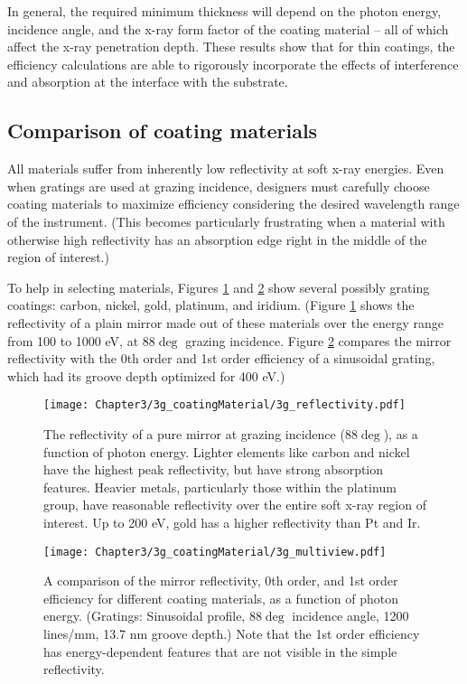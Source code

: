 In general, the required minimum thickness will depend on the photon energy, incidence angle, and the x-ray form factor of the coating material -- all of which affect the x-ray penetration depth.  These results show that for thin coatings, the efficiency calculations are able to rigorously incorporate the effects of interference and absorption at the interface with the substrate.

\subsection{Comparison of coating materials}
All materials suffer from inherently low reflectivity at soft x-ray energies.  Even when gratings are used at grazing incidence, designers must carefully choose coating materials to maximize efficiency considering the desired wavelength range of the instrument.  (This becomes particularly frustrating when a material with otherwise high reflectivity has an absorption edge right in the middle of the region of interest.)

To help in selecting materials, Figures \ref{3g} and \ref{3g-2} show several possibly grating coatings: carbon, nickel, gold, platinum, and iridium.  (Figure \ref{3g} shows the reflectivity of a plain mirror made out of these materials over the energy range from 100 to  1000 eV, at 88$\deg$ grazing incidence.  Figure \ref{3g-2} compares the mirror reflectivity with the 0th order and 1st order efficiency of a sinusoidal grating, which had its groove depth optimized for 400 eV.)

\begin{figure}[htbp] %
   \centering
   \texttt{[image: Chapter3/3g\_coatingMaterial/3g\_reflectivity.pdf]} 
   \caption[The reflectivity of a pure mirror at grazing incidence (88$\deg$), as a function of photon energy.]{The reflectivity of a pure mirror at grazing incidence (88$\deg$), as a function of photon energy.  Lighter elements like carbon and nickel have the highest peak reflectivity, but have strong absorption features.  Heavier metals, particularly those within the platinum group, have reasonable reflectivity over the entire soft x-ray region of interest.  Up to 200 eV, gold has a higher reflectivity than Pt and Ir. }
   \label{3g}
\end{figure}

\begin{figure}[htbp] %
   \centering
   \texttt{[image: Chapter3/3g\_coatingMaterial/3g\_multiview.pdf]} 
   \caption[A comparison of the mirror reflectivity, 0th order, and 1st order efficiency for different coating materials, as a function of photon energy.]{A comparison of the mirror reflectivity, 0th order, and 1st order efficiency for different coating materials, as a function of photon energy.  (Gratings: Sinusoidal profile, 88$\deg$ incidence angle, 1200 lines/mm, 13.7 nm groove depth.)  Note that the 1st order efficiency has energy-dependent features that are not visible in the simple reflectivity.}
   \label{3g-2}
\end{figure}

